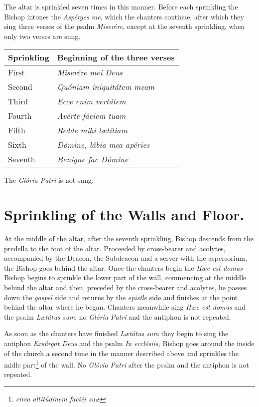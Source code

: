 \documentclass[letterpaper]{report}
\begin{document}
{    \rubric The altar is sprinkled seven times in this manner. Before each
    sprinkling the Bishop intones the \textit{Asp\'erges me,} which the
    chanters continue, after which they sing three verses of the psalm
    \textit{Miser\'ere,} except at the seventh sprinkling, when only two verses
    are sung.

    \begin{tabular}{l l}
        \toprule
        Sprinkling & Beginning of the three verses \\
        \midrule
        First   & \textit{Miserére mei Deus} \\
        Second  & \textit{Quóniam iniquitátem meam} \\
        Third   & \textit{Ecce enim vertátem} \\
        Fourth  & \textit{Avérte fáciem tuam} \\
        Fifth   & \textit{Redde mihi l\ae títiam} \\
        Sixth   & \textit{Dómine, lábia mea apéries} \\
        Seventh & \textit{Benígne fac Dómine} \\
        \bottomrule
    \end{tabular}

    The \textit{Gl\'oria Patri} is not sung.

    \section{Sprinkling of the Walls and Floor.}

    \rubric At the middle of the altar, after the seventh sprinkling, Bishop
    descends from the predella to the foot of the altar. Proceeded by
    cross-bearer and acolytes, accompanied by the Deacon, the Subdeacon and a
    server with the aspersorium, the Bishop goes behind the altar. Once the
    chanters begin the \textit{H\ae c est domus} Bishop begins to sprinkle the
    lower part of the wall, commencing at the middle behind the altar and then,
    preceded by the cross-bearer and acolytes, he passes down the
    \textit{gospel} side and returns by the \textit{epistle} side and finishes
    at the point behind the altar where he began. Chanters meanwhile sing
    \textit{H\ae c est domus} and the psalm \textit{L\ae tátus sum}; no
    \textit{Glória Patri} and the antiphon is not repeated.

    \rubric As soon as the chanters have finished \textit{L\ae t\'atus sum}
    they begin to sing the antiphon \textit{Exs\'urgat Deus} and the psalm
    \textit{In eccl\'esiis,} Bishop goes around the inside of the church a
    second time in the manner described above and sprinkles the midle
    part\footnote{\textit{circa altit\'udinem faci\'ei su\ae}} of the wall. No
    \textit{Glória Patri} after the psalm and the antiphon is not repeated.

}
\end{document}
